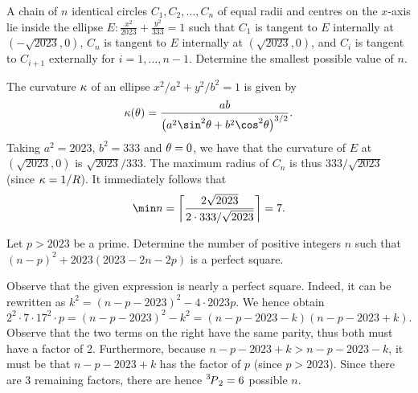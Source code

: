 \begin{question}[7]\label{Q::2023-O-1-24}
    A chain of $n$ identical circles $C_1, C_2, \ldots, C_n$ of equal radii and centres on the $x$-axis lie inside the ellipse $E: \frac{x^2}{2023} + \frac{y^2}{333} = 1$ such that $C_1$ is tangent to $E$ internally at $(-\sqrt{2023}, 0)$, $C_n$ is tangent to $E$ internally at $(\sqrt{2023}, 0)$, and $C_i$ is tangent to $C_{i+1}$ externally for $i = 1, \ldots , n-1$. Determine the smallest possible value of $n$.
\end{question}
\begin{solution*}
    The curvature $\kappa$ of an ellipse $x^2/a^2 + y^2/b^2 = 1$ is given by \[\k(\t) = \frac{ab}{\bp{a^2\sin^2\t + b^2\cos^2\t}^{3/2}}.\] Taking $a^2 = 2023$, $b^2 = 333$ and $\theta = 0$, we have that the curvature of $E$ at $(\sqrt{2023}, 0)$ is $\sqrt{2023}/333$. The maximum radius of $C_n$ is thus $333/\sqrt{2023}$ (since $\kappa = 1/R$). It immediately follows that \[\min n = \ceil{\frac{2\sqrt{2023}}{2 \cdot 333/\sqrt{2023}}} = 7.\]
\end{solution*}
    
\begin{question}[6]\label{Q::2023-O-1-25}
    Let $p > 2023$ be a prime. Determine the number of positive integers $n$ such that $(n-p)^2 + 2023(2023 - 2n - 2p)$ is a perfect square.
\end{question}
\begin{solution*}
    Observe that the given expression is nearly a perfect square. Indeed, it can be rewritten as $k^2 = (n-p-2023)^2 - 4 \cdot 2023 p$. We hence obtain \[2^2 \cdot 7 \cdot 17^2 \cdot p = (n-p-2023)^2 - k^2 = (n-p-2023-k)(n-p-2023+k).\] Observe that the two terms on the right have the same parity, thus both must have a factor of 2. Furthermore, because $n-p-2023 + k > n-p-2023-k$, it must be that $n-p-2023+k$ has the factor of $p$ (since $p > 2023$). Since there are 3 remaining factors, there are hence $\prescript{3\mkern-2.5mu}{}P_{2} = 6$ possible $n$.
\end{solution*}